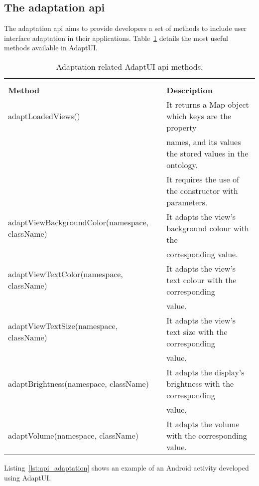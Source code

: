 \subsection{The adaptation \ac{api}}
\label{sec:adaptation_api}

The adaptation \ac{api} aims to provide developers a set of methods to include
user interface adaptation in their applications. Table~\ref{tbl:api_adaptation} 
details the most useful methods available in AdaptUI.

\begin{center}
\footnotesize
\begin{longtable}{l l}
  \caption{Adaptation related AdaptUI \ac{api} methods.}\\
  \label{tbl:api_adaptation} \\
  \hline 
  \textbf{Method}				& \textbf{Description}					\\
  \hline
  adaptLoadedViews()				& It returns a Map object which keys are the property	\\
						& names, and its values the stored values in the ontology.\\
						& It requires the use of the constructor with parameters.\\
  adaptViewBackgroundColor(namespace, className)& It adapts the view's background colour with the 	\\
						& corresponding value.					\\
  adaptViewTextColor(namespace, className)	& It adapts the view's text colour with the corresponding\\
						& value.						\\
  adaptViewTextSize(namespace, className)	& It adapts the view's text size with the corresponding	\\
						& value.						\\
  adaptBrightness(namespace, className)		& It adapts the display's brightness with the corresponding\\
						& value.						\\
  adaptVolume(namespace, className)		& It adapts the volume with the corresponding value.	\\
  \hline
\end{longtable}
\end{center}

Listing~\ref{lst:api_adaptation} shows an example of an Android activity 
developed using AdaptUI. 

\inputminted[linenos=true, fontsize=\footnotesize, frame=lines]{java}{4_system_architecture/api_adaptation.java}
